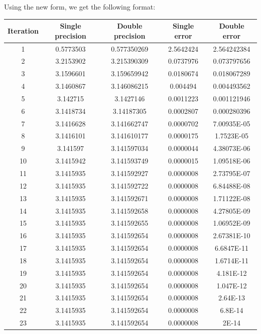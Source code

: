 \documentclass{article}
\begin{document}
Using the new form, we get the following format:
\begin{center}
\begin{longtable}{|c|c|c|c|c|}
Iteration	&	Single precision	&	Double precision	&	Single error	&	Double error	\\ \hline
1	&	0.5773503	&	0.577350269	&	2.5642424	&	2.564242384	\\ \hline
2	&	3.2153902	&	3.215390309	&	0.0737976	&	0.073797656	\\ \hline
3	&	3.1596601	&	3.159659942	&	0.0180674	&	0.018067289	\\ \hline
4	&	3.1460867	&	3.146086215	&	0.004494	&	0.004493562	\\ \hline
5	&	3.142715	&	3.1427146	&	0.0011223	&	0.001121946	\\ \hline
6	&	3.1418734	&	3.14187305	&	0.0002807	&	0.000280396	\\ \hline
7	&	3.1416628	&	3.141662747	&	0.0000702	&	7.00935E-05	\\ \hline
8	&	3.1416101	&	3.141610177	&	0.0000175	&	1.7523E-05	\\ \hline
9	&	3.141597	&	3.141597034	&	0.0000044	&	4.38073E-06	\\ \hline
10	&	3.1415942	&	3.141593749	&	0.0000015	&	1.09518E-06	\\ \hline
11	&	3.1415935	&	3.141592927	&	0.0000008	&	2.73795E-07	\\ \hline
12	&	3.1415935	&	3.141592722	&	0.0000008	&	6.84488E-08	\\ \hline
13	&	3.1415935	&	3.141592671	&	0.0000008	&	1.71122E-08	\\ \hline
14	&	3.1415935	&	3.141592658	&	0.0000008	&	4.27805E-09	\\ \hline
15	&	3.1415935	&	3.141592655	&	0.0000008	&	1.06952E-09	\\ \hline
16	&	3.1415935	&	3.141592654	&	0.0000008	&	2.67381E-10	\\ \hline
17	&	3.1415935	&	3.141592654	&	0.0000008	&	6.6847E-11	\\ \hline
18	&	3.1415935	&	3.141592654	&	0.0000008	&	1.6714E-11	\\ \hline
19	&	3.1415935	&	3.141592654	&	0.0000008	&	4.181E-12	\\ \hline
20	&	3.1415935	&	3.141592654	&	0.0000008	&	1.047E-12	\\ \hline
21	&	3.1415935	&	3.141592654	&	0.0000008	&	2.64E-13	\\ \hline
22	&	3.1415935	&	3.141592654	&	0.0000008	&	6.8E-14	\\ \hline
23	&	3.1415935	&	3.141592654	&	0.0000008	&	2E-14	\\ \hline

\end{longtable}
\end{center}
\end{document}
